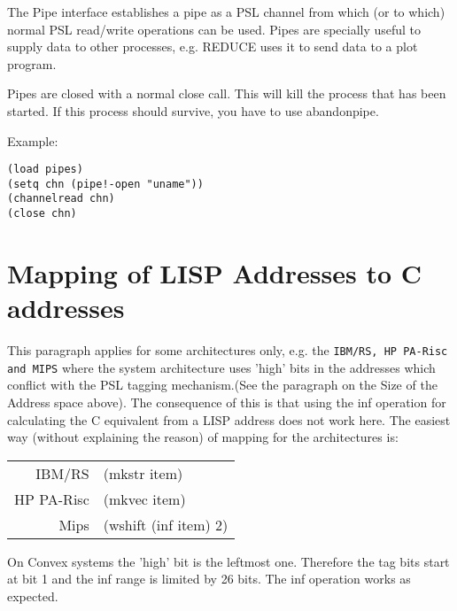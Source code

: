 The Pipe interface establishes a pipe as a PSL channel from which
(or to which) normal PSL read/write operations can be used.
Pipes are specially useful to supply data to other processes, e.g.
REDUCE uses it to send data to a plot program.
\\


Pipes are closed with a normal close call. This will kill the process
that has been started. If this process should survive, you have to use
abandonpipe.
\\

                                               
Example:
\begin{verbatim}
(load pipes)
(setq chn (pipe!-open "uname"))
(channelread chn)
(close chn)
\end{verbatim}

\section{Mapping of LISP Addresses to C addresses}

This paragraph applies for some architectures only, e.g. 
the {\tt IBM/RS, HP PA-Risc and MIPS} where the system architecture
uses 'high' bits in the addresses which conflict with the
PSL tagging mechanism.(See the paragraph on the Size of the
Address space above).  The consequence of this is that using the 
inf operation
for calculating the C equivalent from a LISP address does not
work here. The easiest way (without explaining the reason)
of mapping for the architectures is:

\begin{tabular}{rl}
	IBM/RS&(mkstr item) \\
	HP PA-Risc&(mkvec item)\\
	Mips&(wshift (inf item) 2)
\end{tabular}

On Convex systems the 'high' bit is the leftmost one. Therefore the
tag bits start at bit 1 and the inf range is limited by 26 bits.
The inf operation works as expected.




